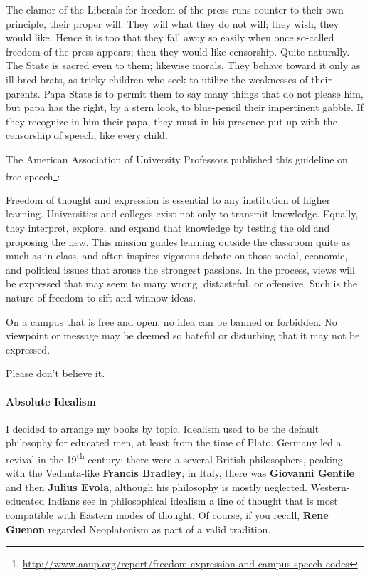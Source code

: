 \begin{quotex}
The clamor of the Liberals for freedom of the press runs counter to their own principle, their proper will. They will what they do not will; they wish, they would like. Hence it is too that they fall away so easily when once so-called freedom of the press appears; then they would like censorship. Quite naturally. The State is sacred even to them; likewise morals. They behave toward it only as ill-bred brats, as tricky children who seek to utilize the weaknesses of their parents. Papa State is to permit them to say many things that do not please him, but papa has the right, by a stern look, to blue-pencil their impertinent gabble. If they recognize in him their papa, they must in his presence put up with the censorship of speech, like every child.
\end{quotex}


The American Association of University Professors published this guideline on free speech\footnote{\url{http://www.aaup.org/report/freedom-expression-and-campus-speech-codes}}:

\begin{quotationx}
Freedom of thought and expression is essential to any institution of higher learning. Universities and colleges exist not only to transmit knowledge. Equally, they interpret, explore, and expand that knowledge by testing the old and proposing the new. This mission guides learning outside the classroom quite as much as in class, and often inspires vigorous debate on those social, economic, and political issues that arouse the strongest passions. In the process, views will be expressed that may seem to many wrong, distasteful, or offensive. Such is the nature of freedom to sift and winnow ideas.

On a campus that is free and open, no idea can be banned or forbidden. No viewpoint or message may be deemed so hateful or disturbing that it may not be expressed.
\end{quotationx}


Please don't believe it.

\paragraph{Absolute Idealism}


I decided to arrange my books by topic. Idealism used to be the default philosophy for educated men, at least from the time of Plato. Germany led a revival in the 19\textsuperscript{th} century; there were a several British philosophers, peaking with the Vedanta-like \textbf{Francis Bradley}; in Italy, there was \textbf{Giovanni Gentile} and then \textbf{Julius Evola}, although his philosophy is mostly neglected. Western-educated Indians see in philosophical idealism a line of thought that is most compatible with Eastern modes of thought. Of course, if you recall, \textbf{Rene Guenon} regarded Neoplatonism as part of a valid tradition.

